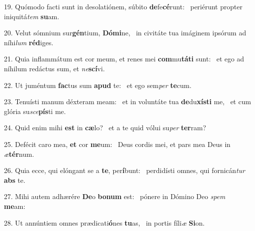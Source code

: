19. Quómodo facti sunt in desolatiónem, súbito \textbf{de}fe\textbf{cé}runt: \ast\  periérunt propter iniquitá\textit{tem} \textbf{su}am.\

20. Velut sómnium sur\textbf{gén}tium, \textbf{Dó}\textbf{mi}ne, \ast\  in civitáte tua imáginem ipsórum ad níhi\textit{lum} \textbf{réd}iges.\

21. Quia inflammátum est cor meum, et renes mei \textbf{com}mu\textbf{tá}\textbf{ti} sunt: \ast\  et ego ad níhilum redáctus sum, et \textit{ne}\textbf{scí}vi.\

22. Ut juméntum \textbf{fac}tus sum \textbf{a}\textbf{pud} te: \ast\  et ego sem\textit{per} \textbf{te}cum.\

23. Tenuísti manum déxteram meam: \dag\  et in voluntáte tua \textbf{de}du\textbf{xís}\textbf{ti} me, \ast\  et cum glória su\textit{sce}\textbf{pís}ti me.\

24. Quid enim mihi \textbf{est} in \textbf{cæ}lo? \ast\  et a te quid vólui su\textit{per} \textbf{ter}ram?\

25. Defécit caro mea, \textbf{et} cor \textbf{me}um: \ast\  Deus cordis mei, et pars mea Deus in \textit{æ}\textbf{tér}num.\

26. Quia ecce, qui elóngant se a \textbf{te}, per\textbf{í}bunt: \ast\  perdidísti omnes, qui fornicán\textit{tur} \textbf{abs} te.\

27. Mihi autem adhærére \textbf{De}o \textbf{bo}\textbf{num} est: \ast\  pónere in Dómino Deo \textit{spem} \textbf{me}am:\

28. Ut annúntiem omnes prædicati\textbf{ó}nes \textbf{tu}as, \ast\  in portis fíli\textit{æ} \textbf{Si}on.\

